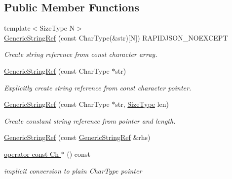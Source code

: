 \subsection*{Public Member Functions}
\begin{DoxyCompactItemize}
\item 
{\footnotesize template$<$Size\+Type N$>$ }\\\hyperlink{structGenericStringRef_aae0c070f914d2486a560150a927c22dc}{Generic\+String\+Ref} (const Char\+Type(\&str)\mbox{[}N\mbox{]}) R\+A\+P\+I\+D\+J\+S\+O\+N\+\_\+\+N\+O\+E\+X\+C\+E\+PT
\begin{DoxyCompactList}\small\item\em Create string reference from {\ttfamily const} character array. \end{DoxyCompactList}\item 
\hyperlink{structGenericStringRef_a9e80d81d5ad49cf0fb4128ace8c548d9}{Generic\+String\+Ref} (const Char\+Type $\ast$str)
\begin{DoxyCompactList}\small\item\em Explicitly create string reference from {\ttfamily const} character pointer. \end{DoxyCompactList}\item 
\hyperlink{structGenericStringRef_a8b2c6a7fdc4da1e7055f7fdcf0ac517f}{Generic\+String\+Ref} (const Char\+Type $\ast$str, \hyperlink{rapidjson_8h_a5ed6e6e67250fadbd041127e6386dcb5}{Size\+Type} len)
\begin{DoxyCompactList}\small\item\em Create constant string reference from pointer and length. \end{DoxyCompactList}\item 
\hyperlink{structGenericStringRef_ab049693082c0b8f5066c00212e780aec}{Generic\+String\+Ref} (const \hyperlink{structGenericStringRef}{Generic\+String\+Ref} \&rhs)
\item 
\hyperlink{structGenericStringRef_a4e652ee3a398d0eb8ece1835d15274d0}{operator const Ch $\ast$} () const
\begin{DoxyCompactList}\small\item\em implicit conversion to plain Char\+Type pointer \end{DoxyCompactList}\end{DoxyCompactItemize}
